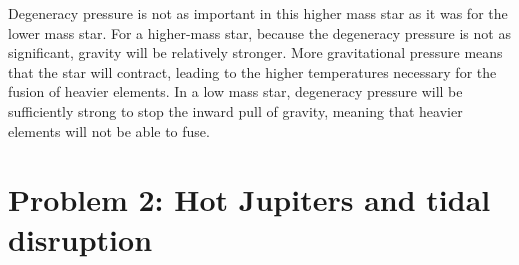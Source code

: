 \documentclass[11pt,letterpaper]{article}
\begin{document}
\begin{enumerate}[label=(\alph*)]
        Degeneracy pressure is not as important in this higher mass star as it was for the lower mass star. For a higher-mass star, because the degeneracy pressure is not as significant, gravity will be relatively stronger. More gravitational pressure means that the star will contract, leading to the higher temperatures necessary for the fusion of heavier elements. In a low mass star, degeneracy pressure will be sufficiently strong to stop the inward pull of gravity, meaning that heavier elements will not be able to fuse. 

\end{enumerate}

\section*{Problem 2: Hot Jupiters and tidal disruption}
\end{document}
